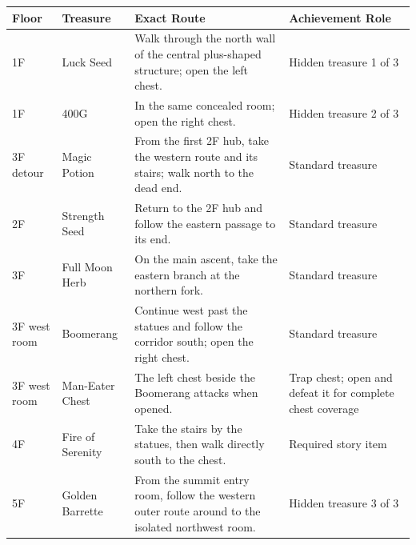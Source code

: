 \documentclass[
  american,
  10pt,
  letterpaper,
  oneside,
  open=any]{scrreprt}
\newcounter{none} %
\newenvironment{guidetable}{%
  \small\setstretch{1.0}%
  \setlength{\tabcolsep}{4pt}%
  \setlength{\LTpre}{8pt}\setlength{\LTpost}{10pt}%
  \renewcommand{\arraystretch}{1.16}%
}{ }
\begin{document}
\begin{guidetable}

{\def\LTcaptype{none} %
\begin{longtable}[]{@{}
  >{\raggedright\arraybackslash}p{}
  >{\raggedright\arraybackslash}p{}
  >{\raggedright\arraybackslash}p{}
  >{\raggedright\arraybackslash}p{}@{}}
\toprule\noalign{}
\begin{minipage}[b]{\linewidth}\raggedright
\color{GuideGreen}\bfseries Floor
\end{minipage} & \begin{minipage}[b]{\linewidth}\raggedright
\color{GuideGreen}\bfseries Treasure
\end{minipage} & \begin{minipage}[b]{\linewidth}\raggedright
\color{GuideGreen}\bfseries Exact Route
\end{minipage} & \begin{minipage}[b]{\linewidth}\raggedright
\color{GuideGreen}\bfseries Achievement Role
\end{minipage} \\
\midrule\noalign{}
\endhead
\bottomrule\noalign{}
\endlastfoot
1F & Luck Seed & Walk through the north wall of the central plus-shaped
structure; open the left chest. & Hidden treasure 1 of 3 \\
1F & 400G & In the same concealed room; open the right chest. & Hidden
treasure 2 of 3 \\
3F detour & Magic Potion & From the first 2F hub, take the western route
and its stairs; walk north to the dead end. & Standard treasure \\
2F & Strength Seed & Return to the 2F hub and follow the eastern passage
to its end. & Standard treasure \\
3F & Full Moon Herb & On the main ascent, take the eastern branch at the
northern fork. & Standard treasure \\
3F west room & Boomerang & Continue west past the statues and follow the
corridor south; open the right chest. & Standard treasure \\
3F west room & Man-Eater Chest & The left chest beside the Boomerang
attacks when opened. & Trap chest; open and defeat it for complete chest
coverage \\
4F & Fire of Serenity & Take the stairs by the statues, then walk
directly south to the chest. & Required story item \\
5F & Golden Barrette & From the summit entry room, follow the western
outer route around to the isolated northwest room. & Hidden treasure 3
of 3 \\
\end{longtable}
}

\end{guidetable}
\end{document}
